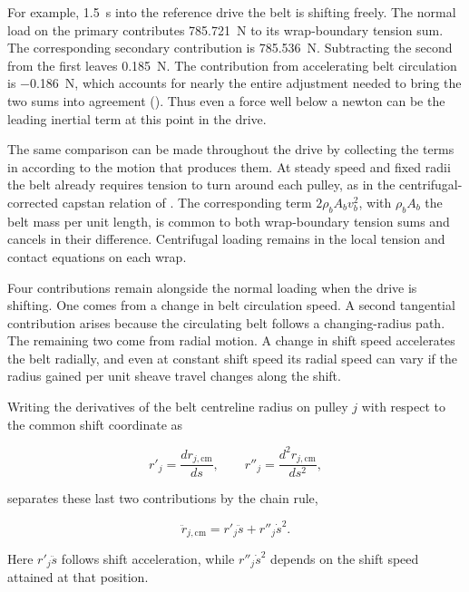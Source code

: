 \documentclass[11pt]{report}
\numberwithin{equation}{section}
\begin{document}
For example, \SI{1.5}{s} into the reference drive the belt is shifting
freely. The normal load on the primary contributes \SI{785.721}{N} to
its wrap-boundary tension sum. The corresponding secondary contribution
is \SI{785.536}{N}. Subtracting the second from the first leaves
\SI{0.185}{N}. The contribution from accelerating belt circulation is
\SI{-0.186}{N}, which accounts for nearly the entire adjustment needed
to bring the two sums into agreement ().
Thus even a force well below a newton can be the leading inertial term
at this point in the drive.

The same comparison can be made throughout the drive by collecting the
terms in  according to the
motion that produces them. At steady speed and fixed radii the belt
already requires tension to turn around each pulley, as in the
centrifugal-corrected capstan relation of
. The corresponding
term \(2\rho_bA_bv_b^2\), with \(\rho_bA_b\) the belt mass per unit
length, is common to both wrap-boundary tension sums and cancels in
their difference. Centrifugal loading remains in the local tension and
contact equations on each wrap.

Four contributions remain alongside the normal loading when the drive
is shifting. One comes from a change in belt circulation speed. A
second tangential contribution arises because the circulating belt
follows a changing-radius path. The remaining two come from radial
motion. A change in shift speed accelerates the belt radially, and even
at constant shift speed its radial speed can vary if the radius gained
per unit sheave travel changes along the shift.

Writing the derivatives of the belt centreline radius on pulley \(j\)
with respect to the common shift coordinate as

\begin{equation}
 r'_j=\frac{dr_{j,\mathrm{cm}}}{ds},
 \qquad
 r''_j=\frac{d^2r_{j,\mathrm{cm}}}{ds^2},
 \label{eq:results_belt_radius_derivatives}
\end{equation}

separates these last two contributions by the chain rule,

\begin{equation}
 \ddot r_{j,\mathrm{cm}}=r'_j\ddot s+r''_j\dot s^2.
 \label{eq:results_belt_radial_acceleration_split}
\end{equation}

Here \(r'_j\ddot s\) follows shift acceleration, while
\(r''_j\dot s^2\) depends on the shift speed attained at that position.
\end{document}
